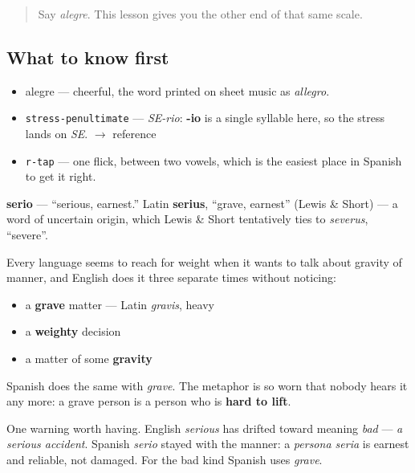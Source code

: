 \label{lesson:ES-C423-serio}



\begin{quote}
Say \emph{alegre}. This lesson gives you the other end of that same scale.
\end{quote}

\subsection*{What to know first}
\begin{itemize}
\raggedright
  \item alegre — cheerful, the word printed on sheet music as \emph{allegro}.
\end{itemize}

\begin{sounds}
\begin{itemize}
\raggedright
  \item \texttt{stress-penultimate} — \emph{SE-rio}: \textbf{-io} is a single syllable here, so the stress lands on \emph{SE}. $\to$ reference
  \item \texttt{r-tap} — one flick, between two vowels, which is the easiest place in Spanish to get it right.
\end{itemize}
\end{sounds}

\begin{cousinweb}
\textbf{serio} — \textquotedblleft{}serious, earnest.\textquotedblright{} Latin \textbf{serius}, \textquotedblleft{}grave, earnest\textquotedblright{} (Lewis \& Short) — a word of uncertain origin, which Lewis \& Short tentatively ties to \emph{severus}, \textquotedblleft{}severe\textquotedblright{}.

Every language seems to reach for weight when it wants to talk about gravity of manner, and English does it three separate times without noticing:

\begin{itemize}
\raggedright
  \item a \textbf{grave} matter — Latin \emph{gravis}, heavy
  \item a \textbf{weighty} decision
  \item a matter of some \textbf{gravity}
\end{itemize}

Spanish does the same with \emph{grave}. The metaphor is so worn that nobody hears it any more: a grave person is a person who is \textbf{hard to lift}.

One warning worth having. English \emph{serious} has drifted toward meaning \emph{bad} — \emph{a serious accident}. Spanish \emph{serio} stayed with the manner: a \emph{persona seria} is earnest and reliable, not damaged. For the bad kind Spanish uses \emph{grave}.
\end{cousinweb}

